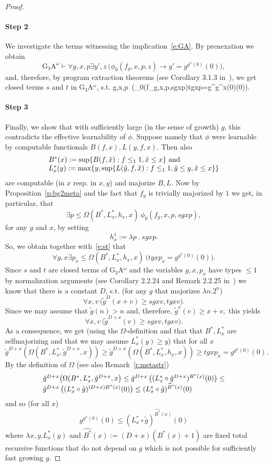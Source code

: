 \begin{proof}
\paragraph{Step 2} We investigate the terms witnessing the implication~\eqref{e:GA}. By prenexation we obtain
\[
\mbox{G$_3$A}^\omega\vdash \forall g,x,p\exists y',z\ \big(\phi_0(f_g,x,p,z)\rightarrow y'=g^{g^{x}(0)}(0)\big),
\]
and, therefore, by program extraction theorems (see Corollary 3.1.3 in~\cite{Kohlenbach(lowrate)}), we get closed terms $s$ and $t$ in G$_3$A$^\omega$, s.t.
\be[e:st]
\forall g,x,p\ \big(\phi_0(f_g,x,p,sgxp)\rightarrow tgxp=g^{g^{x}(0)}(0)\big).
\ee
\paragraph{Step 3} Finally, we show that with sufficiently large (in the sense of growth) $g$, this contradicts the effective learnability of $\phi$. Suppose namely that $\phi$ were learnable by computable functionals $B(f,x),L(y,f,x).$ 
Then also 
\[ \ba{l} B^*(x):=\sup \{ B(f,\tilde{x}): f\le_1 1, \tilde{x}\le x\} \ 
\mbox{and} \\ 
L^*_x(y):=\max\{ y,\sup \{ L(\tilde{y},f,\tilde{x}): f\le_1 1,\tilde{y}\le y,
\tilde{x}\le x\}\}\ea \] 
are computable (in $x$ resp. in $x,y$) and majorize $B,L.$ 
Now by Proposition~\ref{p:bg2meta} and the fact that $f_g$ is trivially 
majorized by $1$ we get, in particular, that 
\[
\exists p\leq \Omega(B^*,L^*_x,h_x,x)\ \phi_0(f_g,x,p, sgxp),
\]
for any $g$ and $x$, by setting \[h^1_x:=\lambda p\ .\ sgxp.\]
So, we obtain together with~\eqref{e:st} that
\[
\forall g,x \exists p_x\leq \Omega(B^*,L^*_x,h_x,x)\ 
\big( tgxp_x =g^{g^{x}(0)}(0)\big).
\]
Since $s$ and $t$ are closed terms of G$_3$A$^\omega$ and the variables 
$g,x,p_x$ have types $\le 1$ by normalization arguments
(see Corollary 2.2.24 and Remark 2.2.25 in~\cite{Kohlenbach(lowrate)}) we know that there is 
a constant $D$, s.t. (for any $g$ that majorizes $\lambda n.2^n$) 
\[ \forall x,v\, \big( \tilde{g}^D(x+v)\ge sgxv,tgxv\big).\] 
Since we may assume that $\tilde{g}(n)>n$ and, therefore, 
$\tilde{g}^x(v)\ge x+v,$ this yields 
\[ \forall x,v\,\big( \tilde{g}^{D+x}(v)\ge sgxv,tgxv\big). \]
As a consequence, we get (using the $\Omega$-definition 
and that that $B^*,L^*_x$ are selfmajorizing and that we may 
assume $L^*_x(y)\ge y$) 
that for all $x$  
\[ \tilde{g}^{D+x}\left(\Omega(B^*,L^*_x,\tilde{g}^{D+x},x)\right) \ge 
\tilde{g}^{D+x}\left(\Omega(B^*,L^*_x,h_x,x)\right) \ge 
tgxp_x=g^{g^x(0)}(0). \]
By the definition of $\Omega$ (see also Remark~\ref{r:metastr}) 
\[   \ba{l} \tilde{g}^{D+x}\big(\Omega(B^*,L^*_x,\tilde{g}^{D+x},x\big)\le 
\tilde{g}^{D+x}
\left((L^*_x\circ\tilde{g}^{D+x})^{B^*(x)}(0)\right) \le \\ 
\tilde{g}^{D+x}\left((L^*_x\circ\tilde{g})^{(D+x)B^*(x)}(0)\right)\le 
(L^*_x\circ \tilde{g})^{\widehat{B}^*(x)}(0)\ea \] 
and so (for all $x$)
\[  g^{g^x(0)}(0)\le (L^*_x\circ \tilde{g})^{\widehat{B^*}(x)}(0) \]
where $\lambda x,y.L^*_x(y)$ and $\widehat{B^*}(x):=(D+x)(B^*(x)+1)$ 
are fixed total recursive functions that do not depend 
on $g$ which is not possible for sufficiently fast growing $g$.
\end{proof}

